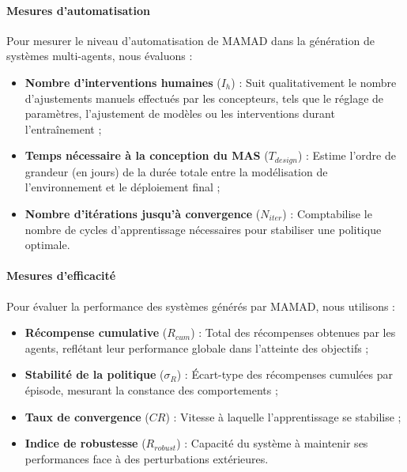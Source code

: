 \paragraph{Mesures d'automatisation}
Pour mesurer le niveau d'automatisation de MAMAD dans la génération de systèmes multi-agents, nous évaluons :
\begin{itemize}
    \item \textbf{Nombre d'interventions humaines} ($I_h$) : Suit qualitativement le nombre d'ajustements manuels effectués par les concepteurs, tels que le réglage de paramètres, l'ajustement de modèles ou les interventions durant l'entraînement ;
    \item \textbf{Temps nécessaire à la conception du MAS} ($T_{design}$) : Estime l'ordre de grandeur (en jours) de la durée totale entre la modélisation de l'environnement et le déploiement final ;
    \item \textbf{Nombre d'itérations jusqu'à convergence} ($N_{iter}$) : Comptabilise le nombre de cycles d'apprentissage nécessaires pour stabiliser une politique optimale.
\end{itemize}

\paragraph{Mesures d'efficacité}
Pour évaluer la performance des systèmes générés par MAMAD, nous utilisons :
\begin{itemize}
    \item \textbf{Récompense cumulative} ($R_{cum}$) : Total des récompenses obtenues par les agents, reflétant leur performance globale dans l'atteinte des objectifs ;
    \item \textbf{Stabilité de la politique} ($\sigma_R$) : Écart-type des récompenses cumulées par épisode, mesurant la constance des comportements ;
    \item \textbf{Taux de convergence} ($CR$) : Vitesse à laquelle l'apprentissage se stabilise ;
    \item \textbf{Indice de robustesse} ($R_{robust}$) : Capacité du système à maintenir ses performances face à des perturbations extérieures.
\end{itemize}


